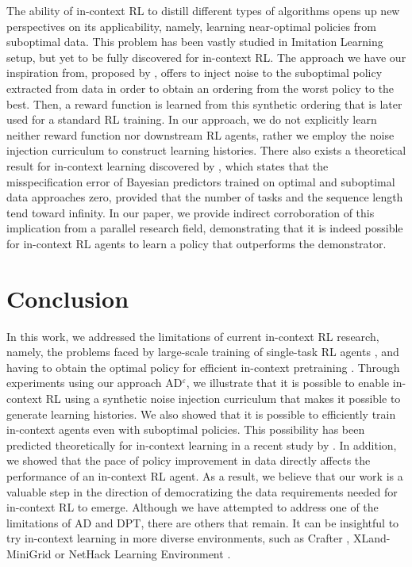 \documentclass{article}
\theoremstyle{plain}
\theoremstyle{definition}
\theoremstyle{remark}
\begin{document}
The ability of in-context RL to distill different types of algorithms \cite{wang2024transformers} opens up new perspectives on its applicability, namely, learning near-optimal policies from suboptimal data. This problem has been vastly studied in Imitation Learning setup, but yet to be fully discovered for in-context RL. The approach we have our inspiration from, proposed by \citet{brown2020better}, offers to inject noise to the suboptimal policy extracted from data in order to obtain an ordering from the worst policy to the best. Then, a reward function is learned from this synthetic ordering that is later used for a standard RL training. In our approach, we do not explicitly learn neither reward function nor downstream RL agents, rather we employ the noise injection curriculum to construct learning histories. There also exists a theoretical result for in-context learning discovered by \citet{jeon2024informationtheoretic}, which states that the misspecification error of Bayesian predictors trained on optimal and suboptimal data approaches zero, provided that the number of tasks and the sequence length tend toward infinity. In our paper, we provide indirect corroboration of this implication from a parallel research field, demonstrating that it is indeed possible for in-context RL agents to learn a policy that outperforms the demonstrator.
\section{Conclusion}
In this work, we addressed the limitations of current in-context RL research, namely, the problems faced by large-scale training of single-task RL agents \cite{laskin2022context}, and having to obtain the optimal policy for efficient in-context pretraining \cite{lee2023supervised}. Through experiments using our approach AD$^\varepsilon$, we illustrate that it is possible to enable in-context RL using a synthetic noise injection curriculum that makes it possible to generate learning histories. We also showed that it is possible to efficiently train in-context agents even with suboptimal policies. This possibility has been predicted theoretically for in-context learning in a recent study by \citet{jeon2024informationtheoretic}. In addition, we showed that the pace of policy improvement in data directly affects the performance of an in-context RL agent. As a result, we believe that our work is a valuable step in the direction of democratizing the data requirements needed for in-context RL to emerge.
Although we have attempted to address one of the limitations of AD and DPT, there are others that remain. It can be insightful to try in-context learning in more diverse environments, such as Crafter \cite{hafner2021benchmarking}, XLand-MiniGrid \cite{nikulin2023xlandminigrid} or NetHack Learning Environment \cite{kuttler2020nethack, hambro2022dungeons, kurenkov2023katakomba}.
\end{document}
